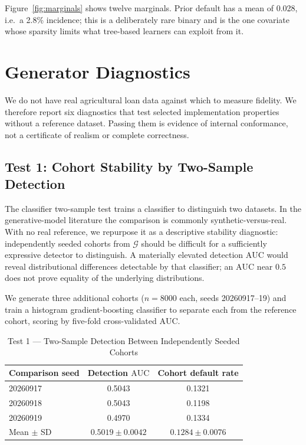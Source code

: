\documentclass[journal]{IEEEtran}
\newcommand{\dgp}{\ensuremath{\mathcal{G}}}
\newcommand{\auc}{\mbox{AUC}}
\begin{document}
Figure~\ref{fig:marginals} shows twelve marginals. Prior default has a mean of 0.028, i.e.\ a 2.8\% incidence; this is a deliberately rare binary and is the one covariate whose sparsity limits what tree-based learners can exploit from it.

\section{Generator Diagnostics}
\label{sec:fidelity}

We do not have real agricultural loan data against which to measure fidelity. We therefore report six diagnostics that test selected implementation properties without a reference dataset. Passing them is evidence of internal conformance, not a certificate of realism or complete correctness.

\subsection{Test 1: Cohort Stability by Two-Sample Detection}
\label{sec:detection}
The classifier two-sample test \cite{lopezpaz2017c2st} trains a classifier to distinguish two datasets. In the generative-model literature the comparison is commonly synthetic-versus-real. With no real reference, we repurpose it as a descriptive stability diagnostic: independently seeded cohorts from $\dgp$ should be difficult for a sufficiently expressive detector to distinguish. A materially elevated detection $\auc$ would reveal distributional differences detectable by that classifier; an $\auc$ near $0.5$ does not prove equality of the underlying distributions.

We generate three additional cohorts ($n=8000$ each, seeds 20260917--19) and train a histogram gradient-boosting classifier to separate each from the reference cohort, scoring by five-fold cross-validated $\auc$.

\begin{table}[!t]
\caption{Test 1 --- Two-Sample Detection Between Independently Seeded Cohorts}
\label{tab:detection}
\centering
\footnotesize
\begin{tabular}{@{}lcc@{}}
\toprule
Comparison seed & Detection $\auc$ & Cohort default rate \\
\midrule
20260917 & 0.5043 & 0.1321 \\
20260918 & 0.5043 & 0.1198 \\
20260919 & 0.4970 & 0.1334 \\
\midrule
Mean $\pm$ SD & $0.5019\pm0.0042$ & $0.1284\pm0.0076$ \\
\bottomrule
\end{tabular}
\end{table}
\end{document}
